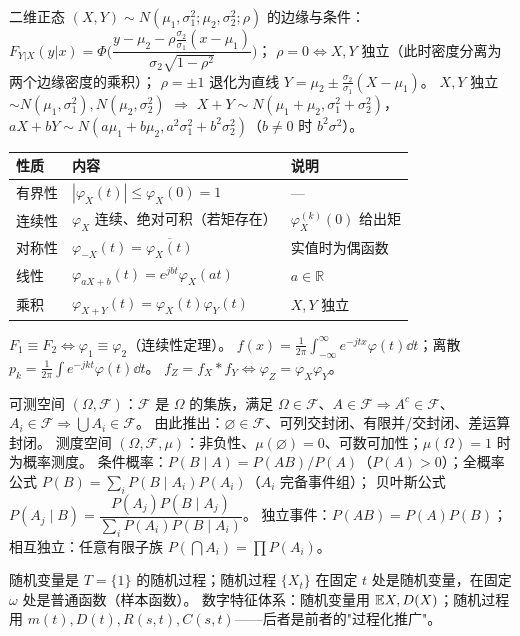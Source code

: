 \documentclass[UTF8,12pt,a4paper]{ctexart}
\begin{document}
二维正态 $(X,Y)\sim N(\mu_1,\sigma_1^2;\mu_2,\sigma_2^2;\rho)$ 的边缘与条件：
$F_{Y|X}(y|x)=\Phi\!\Big(\dfrac{y-\mu_2-\rho\frac{\sigma_2}{\sigma_1}(x-\mu_1)}{\sigma_2\sqrt{1-\rho^2}}\Big)$；
$\rho=0\iff X,Y$ 独立（此时密度分离为两个边缘密度的乘积）；
$\rho=\pm1$ 退化为直线 $Y=\mu_2\pm\frac{\sigma_2}{\sigma_1}(X-\mu_1)$。
 $X,Y$ 独立 $\sim N(\mu_1,\sigma_1^2),N(\mu_2,\sigma_2^2)$ $\Rightarrow$ $X+Y\sim N(\mu_1+\mu_2,\sigma_1^2+\sigma_2^2)$，$aX+bY\sim N(a\mu_1+b\mu_2,a^2\sigma_1^2+b^2\sigma_2^2)$（$b\ne0$ 时 $b^2\sigma^2$）。

\begin{center}\footnotesize
\begin{tabular}{p{1.93cm}p{4.23cm}p{2.48cm}}\hline
性质 & 内容 & 说明\\\hline
有界性 & $|\varphi_X(t)|\le\varphi_X(0)=1$ & ---\\
连续性 & $\varphi_X$ 连续、绝对可积（若矩存在） & $\varphi_X^{(k)}(0)$ 给出矩\\
对称性 & $\varphi_{-X}(t)=\overline{\varphi_X(t)}$ & 实值时为偶函数\\
线性 & $\varphi_{aX+b}(t)=e^{jbt}\varphi_X(at)$ & $a\in\mathbb R$\\
乘积 & $\varphi_{X+Y}(t)=\varphi_X(t)\varphi_Y(t)$ & $X,Y$ 独立\\\hline
\end{tabular}\end{center}
 $F_1\equiv F_2\iff\varphi_1\equiv\varphi_2$（连续性定理）。
 $f(x)=\frac1{2\pi}\int_{-\infty}^{\infty}e^{-jtx}\varphi(t)\dd t$；离散 $p_k=\frac1{2\pi}\int e^{-jkt}\varphi(t)\dd t$。
 $f_Z=f_X*f_Y\iff\varphi_Z=\varphi_X\varphi_Y$。

可测空间 $(\Omega,\mathcal F)$：$\mathcal F$ 是 $\Omega$ 的集族，满足 $\Omega\in\mathcal F$、$A\in\mathcal F\Rightarrow A^c\in\mathcal F$、$A_i\in\mathcal F\Rightarrow\bigcup A_i\in\mathcal F$。
由此推出：$\varnothing\in\mathcal F$、可列交封闭、有限并/交封闭、差运算封闭。
测度空间 $(\Omega,\mathcal F,\mu)$：非负性、$\mu(\varnothing)=0$、可数可加性；$\mu(\Omega)=1$ 时为概率测度。
条件概率：$P(B\mid A)=P(AB)/P(A)$（$P(A)>0$）；全概率公式 $P(B)=\sum_iP(B\mid A_i)P(A_i)$（$A_i$ 完备事件组）；
贝叶斯公式 $P(A_j\mid B)=\dfrac{P(A_j)P(B\mid A_j)}{\sum_iP(A_i)P(B\mid A_i)}$。
独立事件：$P(AB)=P(A)P(B)$；相互独立：任意有限子族 $P(\bigcap A_i)=\prod P(A_i)$。

随机变量是 $T=\{1\}$ 的随机过程；随机过程 $\{X_t\}$ 在固定 $t$ 处是随机变量，在固定 $\omega$ 处是普通函数（样本函数）。
数字特征体系：随机变量用 $\mathbb{E} X,D(X)$；随机过程用 $m(t),D(t),R(s,t),C(s,t)$——后者是前者的"过程化推广"。
\end{document}
